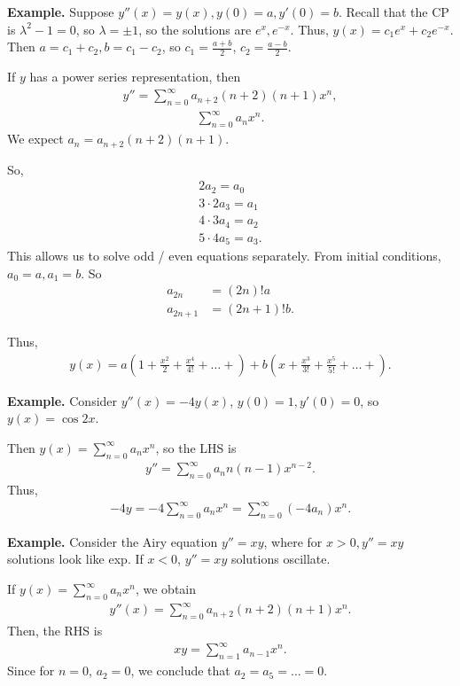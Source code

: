 \documentclass{article}
\begin{document}
{\bf Example.} Suppose $y''(x) = y(x), y(0) = a, y'(0) = b$.  Recall that the CP is $\lambda^2 - 1 = 0$, so $\lambda = \pm1$, so the solutions are $e^x, e^{-x}$.  Thus, $y(x) = c_1 e^x + c_2 e^{-x}$.  Then $a = c_1 + c_2, b = c_1 - c_2$, so $c_1 = \frac{a+b}{2}$, $c_2 = \frac{a-b}{2}$.

If $y$ has a power series representation, then
\begin{align*}
  y'' = \sum_{n=0}^{\infty} a_{n+2}(n+2)(n+1) x^n,
\end{align*}
\begin{align*}
  \sum_{n=0}^{\infty} a_n x^n.
\end{align*}
We expect $a_n = a_{n+2} (n+2)(n+1)$.

So,
\begin{align*}
  2 a_2 = a_0 \\
  3 \cdot 2 a_3 = a_1 \\
  4 \cdot 3 a_4 = a_2 \\ 
  5 \cdot 4 a_5 = a_3.
\end{align*}
This allows us to solve odd / even equations separately.  From initial conditions, $a_0 = a, a_1 = b$.  So
\begin{align*}
  a_{2n} &= (2n)! a \\
  a_{2n+1} &= (2n+1)! b.
\end{align*}

Thus,
\begin{align*}
  y(x) = a(1 + \frac{x^2}{2} + \frac{x^4}{4!} + \dots + ) + b (x + \frac{x^3}{3!} + \frac{x^5}{5!} + \dots + ).
\end{align*}

{\bf Example.} Consider $y''(x) = - 4y(x)$, $y(0) = 1, y'(0) = 0$, so $y(x) = \cos 2x$.

Then $y(x) = \sum_{n=0}^{\infty} a_n x^n$, so the LHS is
\begin{align*}
  y'' = \sum_{n=0}^{\infty} a_n n (n-1) x^{n-2}.
\end{align*}
Thus,
\begin{align*}
  -4 y = - 4 \sum_{n=0}^{\infty} a_n x^n = \sum_{n=0}^{\infty} (-4 a_n) x^n.
\end{align*}

{\bf Example.} Consider the Airy equation $y'' = xy$, where for $x > 0, y'' = xy$ solutions look like exp.  If $x < 0$, $y'' = xy$ solutions oscillate.

If $y(x) = \sum_{n=0}^{\infty} a_n x^n$, we obtain
\begin{align*}
  y''(x) =\sum_{n=0}^{\infty} a_{n+2}(n+2)(n+1) x^n.
\end{align*}
Then, the RHS is
\begin{align*}
  xy = \sum_{n=1}^{\infty} a_{n-1} x^n.
\end{align*}
Since for $n = 0$, $a_2 = 0$, we conclude that $a_2 = a_5 = \dots = 0$.
\end{document}
